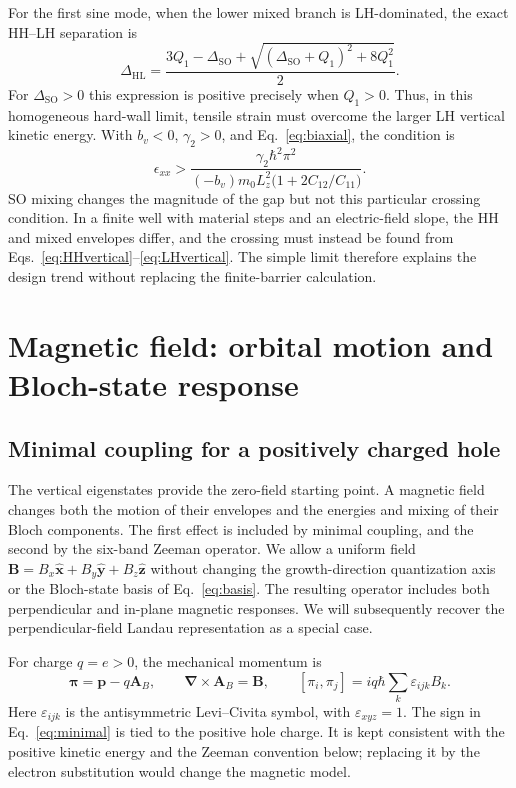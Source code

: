 \documentclass[10pt,letterpaper]{article}
\newcommand{\ep}{\epsilon}
\newcommand{\SO}{\mathrm{SO}}
\newcommand{\HLgap}{\Delta_{\mathrm{HL}}}
\begin{document}
For the first sine mode, when the lower mixed branch is LH-dominated, the exact HH--LH separation is
\begin{equation}
\HLgap=\frac{3Q_1-\Delta_{\SO}
+\sqrt{(\Delta_{\SO}+Q_1)^2+8Q_1^2}}{2}.
\label{eq:hardwallgap}
\end{equation}
For $\Delta_{\SO}>0$ this expression is positive precisely when $Q_1>0$. Thus, in this homogeneous hard-wall limit, tensile strain must overcome the larger LH vertical kinetic energy. With $b_v<0$, $\gamma_2>0$, and Eq.~\eqref{eq:biaxial}, the condition is
\begin{equation}
\ep_ {xx}>
\frac{\gamma_2\hbar^2\pi^2}
{(-b_v)m_0L_z^2\bigl(1+2C_{12}/C_{11}\bigr)}.
\label{eq:strainthreshold}
\end{equation}
SO mixing changes the magnitude of the gap but not this particular crossing condition. In a finite well with material steps and an electric-field slope, the HH and mixed envelopes differ, and the crossing must instead be found from Eqs.~\eqref{eq:HHvertical}--\eqref{eq:LHvertical}. The simple limit therefore explains the design trend without replacing the finite-barrier calculation.

\section{Magnetic field: orbital motion and Bloch-state response}
\label{sec:magnetic}

\subsection{Minimal coupling for a positively charged hole}

The vertical eigenstates provide the zero-field starting point. A magnetic field changes both the motion of their envelopes and the energies and mixing of their Bloch components. The first effect is included by minimal coupling, and the second by the six-band Zeeman operator. We allow a uniform field $\bm B=B_x\hat{\bm x}+B_y\hat{\bm y}+B_z\hat{\bm z}$ without changing the growth-direction quantization axis or the Bloch-state basis of Eq.~\eqref{eq:basis}. The resulting operator includes both perpendicular and in-plane magnetic responses. We will subsequently recover the perpendicular-field Landau representation as a special case.

For charge $q=e>0$, the mechanical momentum is
\begin{equation}
\bm\pi=\bm p-q\bm A_B,
\qquad
\bm\nabla\times\bm A_B=\bm B,
\qquad
[\pi_i,\pi_j]=iq\hbar\sum_k\varepsilon_{ijk}B_k.
\label{eq:minimal}
\end{equation}
Here $\varepsilon_{ijk}$ is the antisymmetric Levi--Civita symbol, with $\varepsilon_{xyz}=1$. The sign in Eq.~\eqref{eq:minimal} is tied to the positive hole charge. It is kept consistent with the positive kinetic energy and the Zeeman convention below; replacing it by the electron substitution would change the magnetic model.
\end{document}
